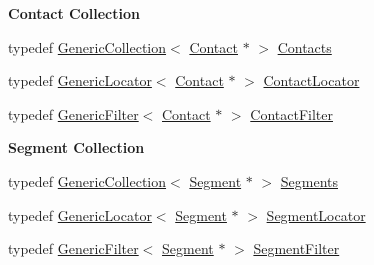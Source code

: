 \begin{Indent}\textbf{ Contact Collection}\par
\begin{DoxyCompactItemize}
\item 
typedef \mbox{\hyperlink{classHurricane_1_1GenericCollection}{Generic\+Collection}}$<$ \mbox{\hyperlink{classHurricane_1_1Contact}{Contact}} $\ast$ $>$ \mbox{\hyperlink{namespaceHurricane_a1e6a8ab09f688509bd727b3fee02d0d2}{Contacts}}
\item 
typedef \mbox{\hyperlink{classHurricane_1_1GenericLocator}{Generic\+Locator}}$<$ \mbox{\hyperlink{classHurricane_1_1Contact}{Contact}} $\ast$ $>$ \mbox{\hyperlink{namespaceHurricane_a244811a7f36de747884f0c1ab1cc1025}{Contact\+Locator}}
\item 
typedef \mbox{\hyperlink{classHurricane_1_1GenericFilter}{Generic\+Filter}}$<$ \mbox{\hyperlink{classHurricane_1_1Contact}{Contact}} $\ast$ $>$ \mbox{\hyperlink{namespaceHurricane_a57f79232601d8739370debec00f89740}{Contact\+Filter}}
\end{DoxyCompactItemize}
\end{Indent}
\begin{Indent}\textbf{ Segment Collection}\par
\begin{DoxyCompactItemize}
\item 
typedef \mbox{\hyperlink{classHurricane_1_1GenericCollection}{Generic\+Collection}}$<$ \mbox{\hyperlink{classHurricane_1_1Segment}{Segment}} $\ast$ $>$ \mbox{\hyperlink{namespaceHurricane_a30748fa53a81cb597d4a13d651238716}{Segments}}
\item 
typedef \mbox{\hyperlink{classHurricane_1_1GenericLocator}{Generic\+Locator}}$<$ \mbox{\hyperlink{classHurricane_1_1Segment}{Segment}} $\ast$ $>$ \mbox{\hyperlink{namespaceHurricane_a37c8302c278e8c1c60c6ffc0222ec4c8}{Segment\+Locator}}
\item 
typedef \mbox{\hyperlink{classHurricane_1_1GenericFilter}{Generic\+Filter}}$<$ \mbox{\hyperlink{classHurricane_1_1Segment}{Segment}} $\ast$ $>$ \mbox{\hyperlink{namespaceHurricane_a891c4a2d614e158d183dada8b0ab1747}{Segment\+Filter}}
\end{DoxyCompactItemize}
\end{Indent}

